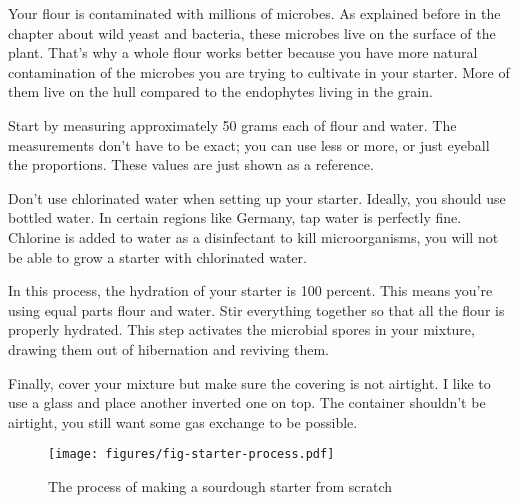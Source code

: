Your flour is contaminated with millions of microbes. As explained
before in the chapter about wild yeast and bacteria, these
microbes live on the surface of the plant. That's why
a whole flour works better because you have more natural
contamination of the microbes you are trying to cultivate
in your starter. More of them live on the hull compared to the
endophytes living in the grain.

Start by measuring approximately 50 grams each of flour and
water. The measurements don't have to be exact; you can use
less or more, or just eyeball the proportions. These
values are just shown as a reference.

Don't use chlorinated water when setting up your starter.
Ideally, you should use bottled water. In certain regions
like Germany, tap water is perfectly fine. Chlorine is added
to water as a disinfectant to kill microorganisms, you will
not be able to grow a starter with chlorinated water.

In this process, the hydration of your starter is 100
percent. This means you're using equal parts flour and
water. Stir everything together so that all the flour is
properly hydrated. This step activates the microbial spores
in your mixture, drawing them out of hibernation and
reviving them.

Finally, cover your mixture but make sure the covering is
not airtight. I like to use a glass and place another
inverted one on top. The container shouldn't be airtight,
you still want some gas exchange to be possible.

\begin{figure}[!htb]
  \texttt{[image: figures/fig-starter-process.pdf]}
  \caption{The process of making a sourdough starter from scratch}
  \label{fig:sourdough-starter-process}
\end{figure}

